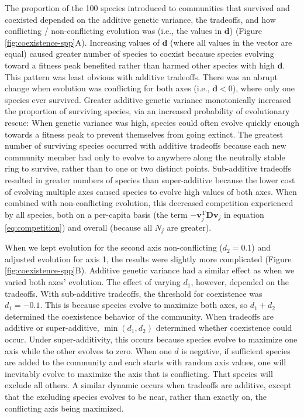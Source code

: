 The proportion of the 100 species introduced to communities that survived and
coexisted depended on the additive genetic variance, 
the tradeoffs, and
how conflicting / non-conflicting evolution was (i.e., the values in $\mathbf{d}$)
(Figure \ref{fig:coexistence-spp}A).
Increasing values of $\mathbf{d}$ (where all values in the vector are equal)
caused greater number of species to coexist
because species evolving toward a fitness peak benefited rather than 
harmed other species with high $\mathbf{d}$.
This pattern was least obvious with additive tradeoffs.
There was an abrupt change when evolution was conflicting for both axes 
(i.e., $\mathbf{d} < 0$), where only one species ever survived.
Greater additive genetic variance monotonically increased the proportion of 
surviving species, via an increased probability 
of evolutionary rescue: When genetic variance was high, 
species could often evolve quickly enough towards a 
fitness peak to prevent themselves from going extinct.
The greatest number of surviving species occurred with additive tradeoffs
because each new community member had only to evolve to anywhere along the
neutrally stable ring to survive, rather than to one or two distinct points.
Sub-additive tradeoffs resulted in greater numbers of species than super-additive
because the lower cost of evolving multiple axes caused species to evolve
high values of both axes.
When combined with non-conflicting evolution,
this decreased competition experienced by all species, both on a 
per-capita basis (the term $- \mathbf{v}_{j}^{\text{T}} \mathbf{D} \mathbf{v}_j$ 
in equation \ref{eq:competition})
and overall (because all $N_j$ are greater).



When we kept evolution for the second axis non-conflicting ($d_2 = 0.1$) and
adjusted evolution for axis 1, the results were slightly more complicated
(Figure \ref{fig:coexistence-spp}B).
Additive genetic variance had a similar effect as when we varied both axes' evolution.
The effect of varying $d_1$, however, depended on the tradeoffs.
With sub-additive tradeoffs, the threshold for coexistence was $d_1 = -0.1$.
This is because species evolve to maximize both axes, so $d_1 + d_2$
determined the coexistence behavior of the community.
When tradeoffs are additive or super-additive, $\min (d_1, d_2)$ determined whether 
coexistence could occur.
Under super-additivity, this occurs because species evolve to maximize one axis while
the other evolves to zero.
When one $d$ is negative, if sufficient species are added to the community and 
each starts with random axis values, 
one will inevitably evolve to maximize the axis that is conflicting. 
That species will exclude all others.
A similar dynamic occurs when tradeoffs are additive, except that
the excluding species evolves to be near, rather than exactly on, 
the conflicting axis being maximized.


